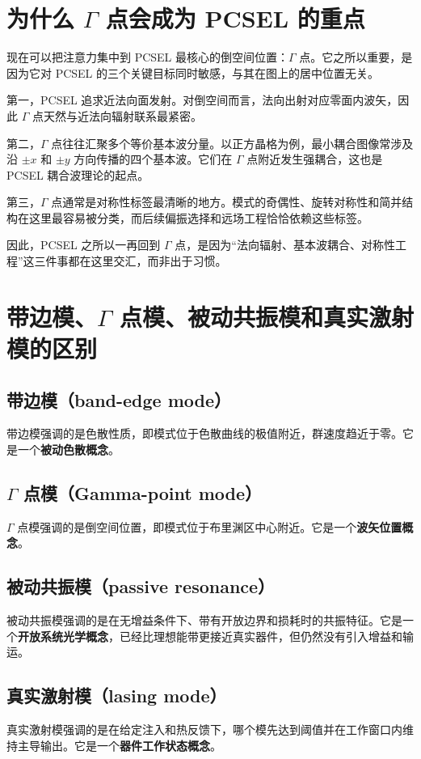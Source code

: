 \section{为什么 \texorpdfstring{$\Gamma$}{Gamma} 点会成为 PCSEL 的重点}
现在可以把注意力集中到 PCSEL 最核心的倒空间位置：$\Gamma$ 点。它之所以重要，是因为它对 PCSEL 的三个关键目标同时敏感，与其在图上的居中位置无关。

第一，PCSEL 追求近法向面发射。对倒空间而言，法向出射对应零面内波矢，因此 $\Gamma$ 点天然与近法向辐射联系最紧密。

第二，$\Gamma$ 点往往汇聚多个等价基本波分量。以正方晶格为例，最小耦合图像常涉及沿 $\pm x$ 和 $\pm y$ 方向传播的四个基本波。它们在 $\Gamma$ 点附近发生强耦合，这也是 PCSEL 耦合波理论的起点。

第三，$\Gamma$ 点通常是对称性标签最清晰的地方。模式的奇偶性、旋转对称性和简并结构在这里最容易被分类，而后续偏振选择和远场工程恰恰依赖这些标签。

因此，PCSEL 之所以一再回到 $\Gamma$ 点，是因为“法向辐射、基本波耦合、对称性工程”这三件事都在这里交汇，而非出于习惯。

\section{带边模、\texorpdfstring{$\Gamma$}{Gamma} 点模、被动共振模和真实激射模的区别}

\subsection*{带边模（band-edge mode）}
带边模强调的是色散性质，即模式位于色散曲线的极值附近，群速度趋近于零。它是一个\textbf{被动色散概念}。

\subsection*{\texorpdfstring{$\Gamma$}{Gamma} 点模（Gamma-point mode）}
$\Gamma$ 点模强调的是倒空间位置，即模式位于布里渊区中心附近。它是一个\textbf{波矢位置概念}。

\subsection*{被动共振模（passive resonance）}
被动共振模强调的是在无增益条件下、带有开放边界和损耗时的共振特征。它是一个\textbf{开放系统光学概念}，已经比理想能带更接近真实器件，但仍然没有引入增益和输运。

\subsection*{真实激射模（lasing mode）}
真实激射模强调的是在给定注入和热反馈下，哪个模先达到阈值并在工作窗口内维持主导输出。它是一个\textbf{器件工作状态概念}。

